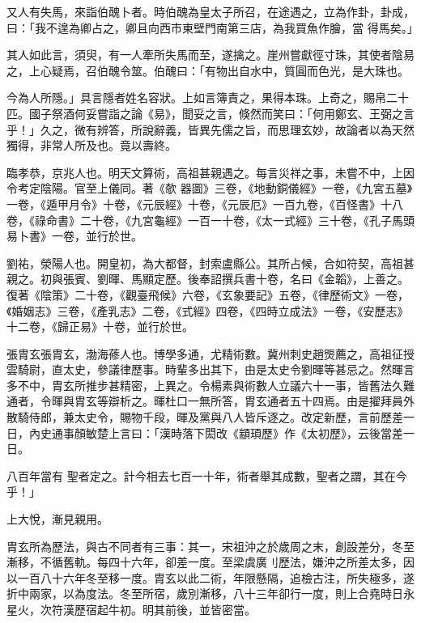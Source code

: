 \begin{pinyinscope}
 又人有失馬，來詣伯醜卜者。時伯醜為皇太子所召，在途遇之，立為作卦，卦成，曰：「我不遑為卿占之，卿且向西市東壁門南第三店，為我買魚作膾，當
 得馬矣。」



 其人如此言，須臾，有一人牽所失馬而至，遂擒之。崖州嘗獻徑寸珠，其使者陰易之，上心疑焉，召伯醜令筮。伯醜曰：「有物出自水中，質圓而色光，是大珠也。



 今為人所隱。」具言隱者姓名容狀。上如言簿責之，果得本珠。上奇之，賜帛二十匹。國子祭酒何妥嘗詣之論《易》，聞妥之言，倏然而笑曰：「何用鄭玄、王弼之言乎！」久之，微有辨答，所說辭義，皆異先儒之旨，而思理玄妙，故論者以為天然獨得，非常人所及也。竟以壽終。



 臨孝恭，京兆人也。明天文算術，高祖甚親遇之。每言災祥之事，未嘗不中，上因令考定陰陽。官至上儀同。著《欹
 器圖》三卷，《地動銅儀經》一卷，《九宮五墓》一卷，《遁甲月令》十卷，《元辰經》十卷，《元辰厄》一百九卷，《百怪書》十八卷，《祿命書》二十卷，《九宮龜經》一百一十卷，《太一式經》三十卷，《孔子馬頭易卜書》一卷，並行於世。



 劉祐，滎陽人也。開皇初，為大都督，封索盧縣公。其所占候，合如符契，高祖甚親之。初與張賓、劉暉、馬顯定歷。後奉詔撰兵書十卷，名曰《金韜》，上善之。復著《陰策》二十卷，《觀臺飛候》六卷，《玄象要記》五卷，《律歷術文》一卷，《婚姻志》三卷，《產乳志》二卷，《式經》四卷，《四時立成法》一卷，《安歷志》十二卷，《歸正易》十卷，並行於世。



 張胄玄張胄玄，渤海蓚人也。博學多通，尤精術數。冀州刺史趙煚薦之，高祖征授雲騎尉，直太史，參議律歷事。時輩多出其下，由是太史令劉暉等甚忌之。然暉言多不中，胄玄所推步甚精密，上異之。令楊素與術數人立議六十一事，皆舊法久難通者，令暉與胄玄等辯析之。暉杜口一無所答，胄玄通者五十四焉。由是擢拜員外散騎侍郎，兼太史令，賜物千段，暉及黨與八人皆斥逐之。改定新歷，言前歷差一日，內史通事顏敏楚上言曰：「漢時落下閎改《顓頊歷》作《太初歷》，云後當差一日。



 八百年當有
 聖者定之。計今相去七百一十年，術者舉其成數，聖者之謂，其在今乎！」



 上大悅，漸見親用。



 胄玄所為歷法，與古不同者有三事：其一，宋祖沖之於歲周之末，創設差分，冬至漸移，不循舊軌。每四十六年，卻差一度。至梁虞廣刂歷法，嫌沖之所差太多，因以一百八十六年冬至移一度。胄玄以此二術，年限懸隔，追檢古注，所失極多，遂折中兩家，以為度法。冬至所宿，歲別漸移，八十三年卻行一度，則上合堯時日永星火，次符漢歷宿起牛初。明其前後，並皆密當。




\end{pinyinscope}
